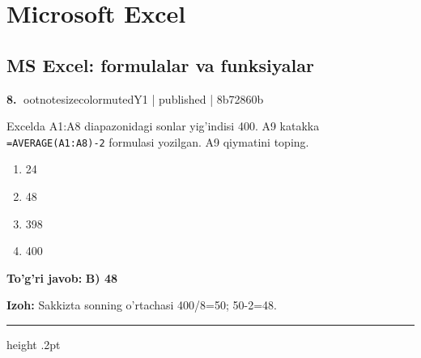 \documentclass[10pt,a4paper]{article}
\begin{document}
\section{Microsoft Excel}
\subsection{MS Excel: formulalar va funksiyalar}

\textbf{\color{ink}8.} {ootnotesizecolor{muted}Y1 | published | 8b72860b}
\par
Excelda A1:A8 diapazonidagi sonlar yig'indisi 400. A9 katakka \texttt{=AVERAGE(A1:A8)-2} formulasi yozilgan. A9 qiymatini toping.
\begin{enumerate}[label=\Alph*),leftmargin=9mm]
\item 24
\item 48
\item 398
\item 400
\end{enumerate}
\begin{tcolorbox}[enhanced,breakable,colback=teal!4,colframe=teal!55!black,boxrule=0.45pt,arc=1.2mm,left=2.8mm,right=2.8mm,top=2mm,bottom=2mm]
\textbf{\color{teal}To'g'ri javob:} \textbf{B) 48}
\par\smallskip
\textbf{Izoh:} Sakkizta sonning o'rtachasi 400/8=50; 50-2=48.
\end{tcolorbox}
\vspace{2mm}\hrule height .2pt\vspace{2mm}
\end{document}
